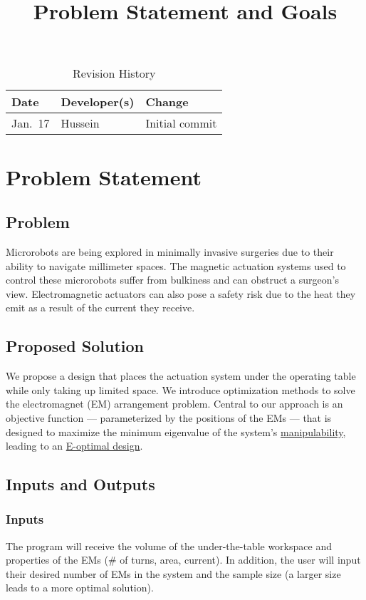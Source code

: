 \documentclass{article}
\title{Problem Statement and Goals\\\progname}
\author{\authname}
\date{}
\begin{document}
\maketitle

\begin{table}[hp]
\caption{Revision History} \label{TblRevisionHistory}
\begin{tabularx}{\textwidth}{llX}
\toprule
\textbf{Date} & \textbf{Developer(s)} & \textbf{Change}\\
\midrule
Jan.~17 & Hussein & Initial commit\\
\bottomrule
\end{tabularx}
\end{table}

\section{Problem Statement}

\subsection{Problem}
Microrobots are being explored in minimally invasive surgeries due to their ability to navigate millimeter spaces. The magnetic actuation systems used to control these microrobots suffer from bulkiness and can obstruct a surgeon's view. Electromagnetic actuators can also pose a safety risk due to the heat they emit as a result of the current they receive. 

\subsection{Proposed Solution}
We propose a design that places the actuation system under the operating table while only taking up limited space. We introduce optimization methods to solve the electromagnet (EM) arrangement problem. Central to our approach is an objective function — parameterized by the positions of the EMs — that is designed to maximize the minimum eigenvalue of the system’s \href{https://en.wikipedia.org/wiki/Manipulability_ellipsoid}{manipulability}, leading to an \href{https://en.wikipedia.org/wiki/Optimal_experimental_design}{E-optimal design}. 

\subsection{Inputs and Outputs}
\subsubsection{Inputs}
The program will receive the volume of the under-the-table workspace and properties of the EMs (\# of turns, area, current). In addition, the user will input their desired number of EMs in the system and the sample size (a larger size leads to a more optimal solution).
\end{document}
